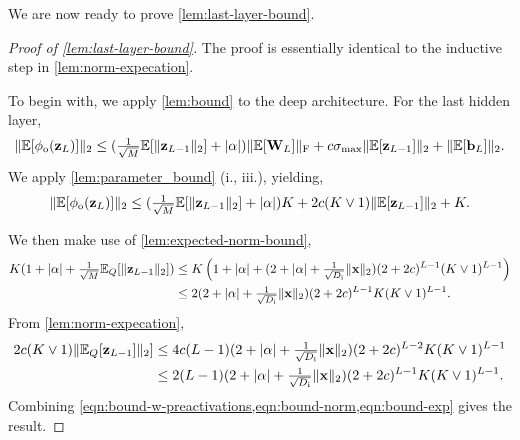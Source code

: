 \documentclass[twoside]{article}
\renewcommand{\ss}[1]{_{\text{#1}}}
\newcommand{\vb}{\mathbf{b}}
\newcommand{\vx}{\mathbf{x}}
\newcommand{\vz}{\mathbf{z}}
\newcommand{\mW}{\mathbf{W}}
\newcommand{\E}{\mathbb{E}}
\renewcommand{\ss}[1]{_{\text{#1}}}        %
\DeclarePairedDelimiter\norm{\|}{\|}             %
\DeclarePairedDelimiter\abs{|}{|}                %
\theoremstyle{theoremstyle}
\begin{document}
We are now ready to prove \cref{lem:last-layer-bound}.
\begin{proof}[Proof of \cref{lem:last-layer-bound}]

The proof is essentially identical to the inductive step in \cref{lem:norm-expecation}. 

To begin with, we apply \cref{lem:bound} to the deep architecture.
For the last hidden layer,%
\begin{equation}
    \norm{\E[\phi\ss{o}(\vz_L)]}_2 \le (\tfrac1{\sqrt{M}}\E[\norm{\vz_{L-1}}_2] + \abs{\alpha})\norm{\E[\mW_L]}\ss{F} + c \sigma\ss{max} \norm{\E[\vz_{L - 1}]}_2 + \norm{\E[\vb_{L}]}_2.
\end{equation}
We apply \cref{lem:parameter_bound} (i., iii.), yielding,
\begin{equation}
    \norm{\E[\phi\ss{o}(\vz_L)]}_2 \le (\tfrac1{\sqrt{M}}\E[\norm{\vz_{L-1}}_2] + \abs{\alpha})K+ 2c (K\lor 1) \norm{\E[\vz_{L - 1}]}_2 + K. \label{eqn:bound-w-preactivations}
\end{equation}

We then make use of \cref{lem:expected-norm-bound},
\begin{align}
  K(1 + |\alpha| + \tfrac1{\sqrt{M}}\E_Q[\norm{\vz_{L-1}}_2]) &\le K\left(1 + |\alpha| + (2 + \abs{\alpha} + \tfrac1{\sqrt{D\ss{i}}}\norm{\vx}_2)(2 + 2c)^{L-1}(K \lor 1)^{L-1}\right) \\
  & \le  2(2 + \abs{\alpha} + \tfrac1{\sqrt{D\ss{i}}}\norm{\vx}_2)(2 + 2c)^{L-1} K(K \lor 1)^{L-1}. \label{eqn:bound-norm}
\end{align}
From \cref{lem:norm-expecation},
\begin{align}
    2c(K \lor 1)\norm{\E_Q[\vz_{L-1}]}_2] &\le 4c(L-1) (2 + \abs{\alpha} + \tfrac1{\sqrt{D\ss{i}}}\norm{\vx}_2)(2 + 2c)^{L-2}K(K \lor 1)^{L-1} \\
    & \le 2(L-1) (2 + \abs{\alpha} + \tfrac1{\sqrt{D\ss{i}}}\norm{\vx}_2)(2 + 2c)^{L-1}K(K \lor 1)^{L-1}. \label{eqn:bound-exp}
\end{align}
Combining \cref{eqn:bound-w-preactivations,eqn:bound-norm,eqn:bound-exp} gives the result. \qedhere




\end{proof}
\end{document}
